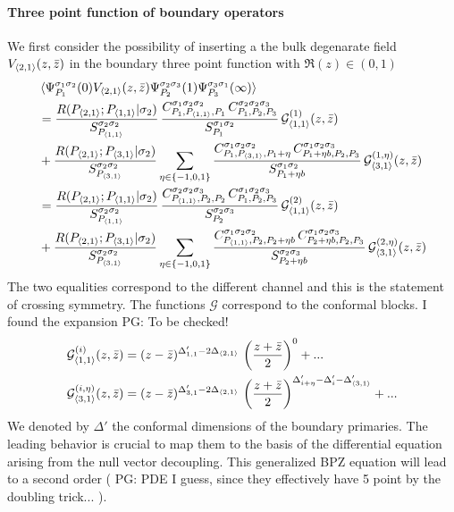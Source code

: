 \documentclass[a4paper]{article}
\newcommand{\purple}[1]{{\color{purple} #1 \color{black}}}
\newcommand{\PG}[1]{{\purple{PG: #1}}} %
\begin{document}
\paragraph{Three point function of boundary operators} We first consider the possibility of inserting a the bulk degenarate field $V_{\braket{2,1}}(z,\bar{z})$ in the boundary three point function with $\Re (z) \in(0,1)$
\begin{equation}
  \begin{aligned}
    &\braket{\Psi_{P_1}^{\sigma_1 \sigma_2}(0)V_{\braket{2,1}}(z,\bar{z})\Psi_{P_2}^{\sigma_2 \sigma_3}(1)\Psi_{P_3}^{\sigma_3 \sigma_1}(\infty)}\\
    &=\frac{R(P_{\braket{2,1}};P_{\braket{1,1}}|\sigma_2)}{S_{P_{\braket{1,1}}}^{\sigma_2 \sigma_2}}\,\frac{C_{P_1,P_{\braket{1,1}},P_1}^{\sigma_1 \sigma_2 \sigma_2}\,C_{P_1,P_2,P_3}^{\sigma_2 \sigma_2 \sigma_3}}{S_{P_1}^{\sigma_1 \sigma_2}}\,\mathcal{G}^{(1)}_{\braket{1,1}}(z,\bar{z})\\
    &+\frac{R(P_{\braket{2,1}};P_{\braket{3,1}}|\sigma_2)}{S_{P_{\braket{3,1}}}^{\sigma_2 \sigma_2}}\sum_{\eta\in\{{-1,0,1}\}}\frac{C_{P_1,P_{\braket{3,1}},P_1+\eta}^{\sigma_1 \sigma_2 \sigma_2}\,C_{P_1+\eta b,P_2,P_3}^{\sigma_1 \sigma_2 \sigma_3}}{S_{P_1+\eta b }^{\sigma_1 \sigma_2}}\,\mathcal{G}^{(1,\eta)}_{\braket{3,1}}(z,\bar{z})\\
    &=\frac{R(P_{\braket{2,1}};P_{\braket{1,1}}|\sigma_2)}{S_{P_{\braket{1,1}}}^{\sigma_2 \sigma_2}}\,\frac{C_{P_{\braket{1,1}},P_{2},P_2}^{\sigma_2 \sigma_2 \sigma_3}\,C_{P_1,P_2,P_3}^{\sigma_1 \sigma_2 \sigma_3}}{S_{P_2}^{\sigma_2 \sigma_3}}\,\mathcal{G}^{(2)}_{\braket{1,1}}(z,\bar{z})\\
    &+\frac{R(P_{\braket{2,1}};P_{\braket{3,1}}|\sigma_2)}{S_{P_{\braket{3,1}}}^{\sigma_2 \sigma_2}}\sum_{\eta\in\{{-1,0,1}\}}\frac{C_{P_{\braket{1,1}},P_{2},P_2+\eta b}^{\sigma_1 \sigma_2 \sigma_2}\,C_{P_2+\eta b,P_2,P_3}^{\sigma_1 \sigma_2 \sigma_3}}{S_{P_2+\eta b }^{\sigma_2 \sigma_3}}\,\mathcal{G}^{(2,\eta)}_{\braket{3,1}}(z,\bar{z})
  \end{aligned}
\end{equation}
The two equalities correspond to the different channel and this is the statement of crossing symmetry. The functions $\mathcal{G}$ correspond to the conformal blocks. I found the expansion \PG{To be checked!}
\begin{equation}
\begin{aligned}
  \mathcal{G}_{\braket{1,1}}^{(i)}(z,\bar{z})&=(z-\bar{z})^{\Delta'_{1,1}-2\Delta_{\braket{2,1}}}\,\left(\frac{z+\bar{z}}{2}\right)^{0} + ...\\
  \mathcal{G}_{\braket{3,1}}^{(i,\eta)}(z,\bar{z})&=(z-\bar{z})^{\Delta'_{3,1}-2\Delta_{\braket{2,1}}}\,\left(\frac{z+\bar{z}}{2}\right)^{\Delta'_{i+\eta}-\Delta'_{i}-\Delta'_{\braket{3,1}}} + ...
\end{aligned}
\end{equation}
We denoted by $\Delta'$ the conformal dimensions of the boundary primaries. The leading behavior is crucial to map them to the basis of the differential equation arising from the null vector decoupling. This generalized BPZ equation will lead to a second order (\PG{PDE I guess, since they effectively have 5 point by the doubling trick...}).
\end{document}
